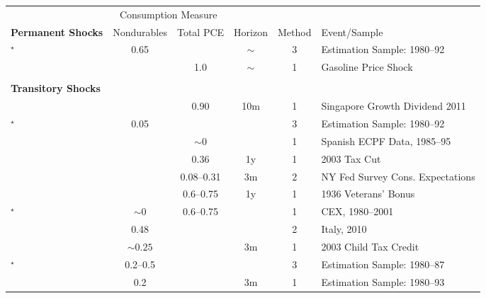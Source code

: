 \begin{tabular}{p{8cm}ccccl}
\toprule
&  \multicolumn{2}{c}{Consumption Measure}&&&\\
\cmidrule(r){2-3}
\textbf{Permanent Shocks} & \multicolumn{1}{c}{Nondurables} & \multicolumn{1}{c}{Total PCE}& Horizon & Method & Event/Sample \\
\midrule
\citet{blundell_consumption_2008}$^\star$ & 0.65& & $\sim$ & 3  & Estimation Sample: 1980--92\\
\citet{gelman_response_2016} &  & 1.0 & $\sim$ & 1  & Gasoline Price Shock \\
\\
\textbf{Transitory Shocks} \\
\midrule
\citet{agarwal_consumption_2014} &  & 0.90 & 10m & 1 & Singapore Growth Dividend 2011 \\
\citet{blundell_consumption_2008}$^\star$ & 0.05& & & 3  & Estimation Sample: 1980--92\\
\citet{browningCollado:AntIncChanges} &  & \multicolumn{1}{c}{$\sim0$} && 1& Spanish ECPF Data, 1985--95\\
\citet{coronadoEtAl} & & \multicolumn{1}{c}{0.36} & 1y & 1 &2003 Tax Cut\\
\citet{fuster_what_2018} & & \multicolumn{1}{c}{0.08--0.31}   & 3m & 2 & NY Fed Survey Cons. Expectations\\
\citet{hausmanVeteransBonus} & &   \multicolumn{1}{c}{0.6--0.75} & 1y & 1 & 1936 Veterans' Bonus\\
\citet{hsieh:alaska}$^\star$ & \multicolumn{1}{c}{$\sim0$}  &  \multicolumn{1}{c}{0.6--0.75} & & 1  & CEX, 1980--2001\\
\citet{jappelli_fiscal_2014} & \multicolumn{1}{c}{0.48} & & & 2  & Italy, 2010 \\
\citet{johnsonEtAl:2003childTaxCredit} & \multicolumn{1}{c}{$\sim0.25$} &  & 3m & 1  & 2003 Child Tax Credit \\
\citet{lusardi}$^\star$ & \multicolumn{1}{c}{0.2--0.5} & & & 3  & Estimation Sample: 1980--87\\
\citet{parkerSocSec} & 0.2 &  & 3m & 1  & Estimation Sample: 1980--93\\

\end{tabular}
